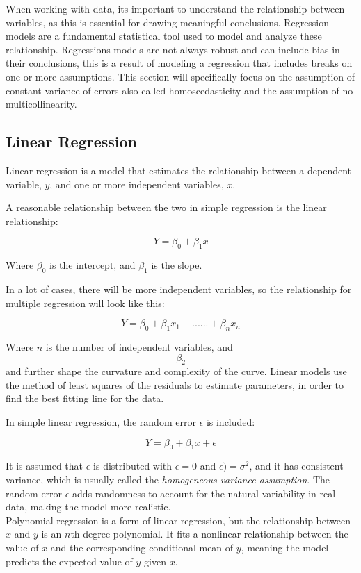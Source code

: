When working with data, its important to understand the relationship between variables, as this is essential for drawing meaningful conclusions. Regression models are a fundamental statistical tool used to model and analyze these relationship. Regressions models are not always robust and can include bias in their conclusions, this is a result of modeling a regression that includes breaks on one or more assumptions. This section will specifically focus on the assumption of constant variance of errors also called homoscedasticity and the assumption of no multicollinearity.


\subsection{Linear Regression}
Linear regression is a model that estimates the relationship between a dependent variable, \( y \), and one or more independent variables, \( x \).

A reasonable relationship between the two in simple regression is the linear relationship:

\[
Y = \beta_0 + \beta_1 x
\]

Where \( \beta_0 \) is the intercept, and \( \beta_1 \) is the slope.

In a lot of cases, there will be more independent variables, so the relationship for multiple regression will look like this:

\[
Y = \beta_0 + \beta_1 x_1 + ......+ \beta_n x_n
\]



Where \( n \) is the number of independent variables, and $$\beta_2$$ and further shape the curvature and complexity of the curve. Linear models use the method of least squares of the residuals to estimate parameters, in order to find the best fitting line for the data.

In simple linear regression, the random error \( \epsilon \) is included:

\[
Y = \beta_0 + \beta_1 x + \epsilon
\]

It is assumed that \( \epsilon \) is distributed with $\epsilon = 0$ and $\epsilon) = \sigma^2$, and it has consistent variance, which is usually called the \textit{homogeneous variance assumption}. The random error \( \epsilon \) adds randomness to account for the natural variability in real data, making the model more realistic.
\newline\\
Polynomial regression is a form of linear regression, but the relationship between \( x \) and \( y \) is an \( n \)th-degree polynomial. It fits a nonlinear relationship between the value of \( x \) and the corresponding conditional mean of \( y \), meaning the model predicts the expected value of \( y \) given \( x \).

